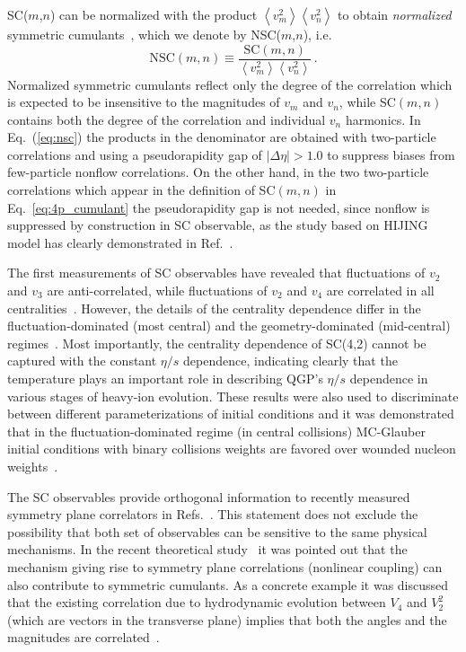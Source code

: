 SC($m$,$n$) can be normalized with the product $\left<v_{m}^2\right>\left<v_{n}^2\right>$ to obtain \textit{normalized} symmetric cumulants~\cite{ALICE:2016kpq,Giacalone:2016afq}, which we denote by NSC($m$,$n$), i.e.
%
\begin{equation}
\mathrm{NSC}(m,n) \equiv \frac{\mathrm{SC}(m,n)}{\left<v_{m}^2\right>\left<v_{n}^2\right>}\,.
\label{eq:nsc}
\end{equation}
%
Normalized symmetric cumulants reflect only the degree of the correlation which is expected to be insensitive to the magnitudes of $v_{m}$ and $v_{n}$, while SC$(m,n)$ contains both the degree of the correlation and individual $v_{n}$ harmonics. In Eq.~(\ref{eq:nsc}) the products in the denominator are obtained with two-particle correlations and using a pseudorapidity gap of $|\Delta\eta|>1.0$ to suppress biases from few-particle nonflow correlations. On the other hand, in the two two-particle correlations which appear in the definition of SC$(m,n)$ in Eq.~\ref{eq:4p_cumulant} the pseudorapidity gap is not needed, since nonflow is suppressed by construction in SC observable, as the study based on HIJING model has clearly demonstrated in Ref.~\cite{ALICE:2016kpq}.

The first measurements of SC observables have revealed that fluctuations of $v_2$ and $v_3$ are anti-correlated, while fluctuations of $v_2$ and $v_4$ are correlated in all centralities~\cite{ALICE:2016kpq}. However, the details of the centrality dependence differ in the fluctuation-dominated (most central) and the geometry-dominated (mid-central) regimes~\cite{ALICE:2016kpq}. Most importantly, the centrality dependence of SC(4,2) cannot be captured with the constant $\eta/s$ dependence, indicating clearly that the temperature plays an important role in describing QGP's $\eta/s$ dependence in various stages of heavy-ion evolution. These results were also used to discriminate between different parameterizations of initial conditions and it was demonstrated that in the fluctuation-dominated regime (in central collisions) MC-Glauber initial conditions with binary collisions weights are favored over wounded nucleon weights~\cite{ALICE:2016kpq}. 

The SC observables provide orthogonal information to recently measured symmetry plane correlators in Refs.~\cite{ALICE:2011ab,Adare:2011tg,Aad:2014fla}. This statement does not exclude the possibility that both set of observables can be sensitive to the same physical mechanisms. In the recent theoretical study~\cite{Giacalone:2016afq} it was pointed out that the mechanism giving rise to symmetry plane correlations (nonlinear coupling) can also contribute to symmetric cumulants. As a concrete example it was discussed that the existing correlation due to hydrodynamic evolution between $V_4$ and $V_2^2$ (which are vectors in the transverse plane) implies that both the angles and the magnitudes are correlated~\cite{Giacalone:2016afq}. 

